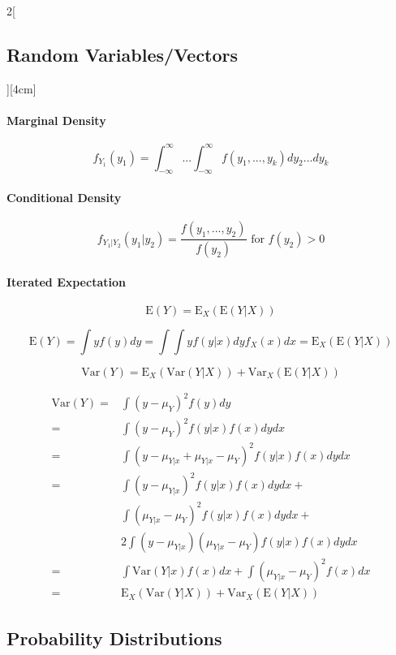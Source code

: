 \documentclass[8pt]{extarticle}
\begin{document}
\begin{multicols}{2}[\subsection{Random Variables/Vectors}][4cm]
\paragraph{Marginal Density}

$$f_{Y_1}(y_1) = \int_{-\infty}^{\infty}...\int_{-\infty}^{\infty} f(y_1,...,y_k)dy_2...dy_k$$

\paragraph{Conditional Density}

$$f_{Y_1|Y_2}(y_1|y_2) = \frac{f(y_1, ..., y_2)}{f(y_2)} \text{ for } f(y_2) > 0$$

\paragraph{Iterated Expectation}

$$\mathrm{E}(Y)=\mathrm{E}_X(\mathrm{E}(Y|X))$$
\begin{Proof}
$$\mathrm{E}(Y) = \int yf(y)dy = \int\int y f(y|x)dy f_X(x)dx = \mathrm{E}_X(\mathrm{E}(Y|X))$$
\end{Proof}
$$\mathrm{Var}(Y) = \mathrm{E}_X(\mathrm{Var}(Y|X)) + \mathrm{Var}_X(\mathrm{E}(Y|X))$$
\begin{Proof}
\begin{align*}
\mathrm{Var}(Y) =&  \int (y- \mu_Y)^2 f(y)dy\\
=& \int (y- \mu_Y)^2 f(y|x)f(x)dydx\\
=& \int (y- \mu_{Y|x} + \mu_{Y|x} - \mu_Y)^2 f(y|x)f(x)dydx\\
=& \int (y- \mu_{Y|x})^2 f(y|x)f(x)dydx + \\
 & \int (\mu_{Y|x} - \mu_Y)^2 f(y|x)f(x)dydx + \\
 & 2 \int (y- \mu_{Y|x})(\mu_{Y|x} - \mu_Y) f(y|x)f(x)dydx \\
=& \int \mathrm{Var}(Y|x)f(x)dx + \int (\mu_{Y|x} - \mu_Y)^2f(x)dx\\
=& \mathrm{E}_X(\mathrm{Var}(Y|X)) + \mathrm{Var}_X(\mathrm{E}(Y|X))
\end{align*}
\end{Proof}

\end{multicols}

\subsection{Probability Distributions}
\end{document}
